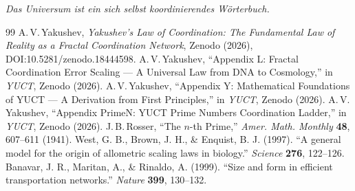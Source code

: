 \documentclass[11pt,a4paper]{article}
\begin{document}
	\begin{center}
		\textit{Das Universum ist ein sich selbst koordinierendes Wörterbuch.}
	\end{center}
	
	\begin{thebibliography}{99}
		A.\,V.\,Yakushev, \emph{Yakushev's Law of Coordination: The Fundamental Law of Reality as a Fractal Coordination Network}, Zenodo (2026), DOI:10.5281/zenodo.18444598.
		A.\,V.\,Yakushev, ``Appendix L: Fractal Coordination Error Scaling — A Universal Law from DNA to Cosmology,'' in \emph{YUCT}, Zenodo (2026).
		A.\,V.\,Yakushev, ``Appendix Y: Mathematical Foundations of YUCT — A Derivation from First Principles,'' in \emph{YUCT}, Zenodo (2026).
		A.\,V.\,Yakushev, ``Appendix PrimeN: YUCT Prime Numbers Coordination Ladder,'' in \emph{YUCT}, Zenodo (2026).
		J.\,B.\,Rosser, ``The \(n\)-th Prime,'' \emph{Amer. Math. Monthly} \textbf{48}, 607--611 (1941).
		West, G. B., Brown, J. H., \& Enquist, B. J. (1997). ``A general model for the origin of allometric scaling laws in biology.'' \emph{Science} \textbf{276}, 122--126.
		Banavar, J. R., Maritan, A., \& Rinaldo, A. (1999). ``Size and form in efficient transportation networks.'' \emph{Nature} \textbf{399}, 130--132.
	\end{thebibliography}
	
\end{document}

